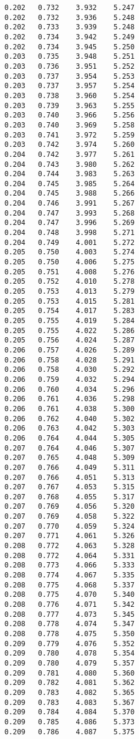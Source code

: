 \begin{verbatim}
   0.202   0.732    3.932    5.247
   0.202   0.732    3.936    5.248
   0.202   0.733    3.939    5.248
   0.202   0.734    3.942    5.249
   0.202   0.734    3.945    5.250
   0.203   0.735    3.948    5.251
   0.203   0.736    3.951    5.252
   0.203   0.737    3.954    5.253
   0.203   0.737    3.957    5.254
   0.203   0.738    3.960    5.254
   0.203   0.739    3.963    5.255
   0.203   0.740    3.966    5.256
   0.203   0.740    3.969    5.258
   0.203   0.741    3.972    5.259
   0.203   0.742    3.974    5.260
   0.204   0.742    3.977    5.261
   0.204   0.743    3.980    5.262
   0.204   0.744    3.983    5.263
   0.204   0.745    3.985    5.264
   0.204   0.745    3.988    5.266
   0.204   0.746    3.991    5.267
   0.204   0.747    3.993    5.268
   0.204   0.747    3.996    5.269
   0.204   0.748    3.998    5.271
   0.204   0.749    4.001    5.272
   0.205   0.750    4.003    5.274
   0.205   0.750    4.006    5.275
   0.205   0.751    4.008    5.276
   0.205   0.752    4.010    5.278
   0.205   0.753    4.013    5.279
   0.205   0.753    4.015    5.281
   0.205   0.754    4.017    5.283
   0.205   0.755    4.019    5.284
   0.205   0.755    4.022    5.286
   0.205   0.756    4.024    5.287
   0.206   0.757    4.026    5.289
   0.206   0.758    4.028    5.291
   0.206   0.758    4.030    5.292
   0.206   0.759    4.032    5.294
   0.206   0.760    4.034    5.296
   0.206   0.761    4.036    5.298
   0.206   0.761    4.038    5.300
   0.206   0.762    4.040    5.302
   0.206   0.763    4.042    5.303
   0.206   0.764    4.044    5.305
   0.207   0.764    4.046    5.307
   0.207   0.765    4.048    5.309
   0.207   0.766    4.049    5.311
   0.207   0.766    4.051    5.313
   0.207   0.767    4.053    5.315
   0.207   0.768    4.055    5.317
   0.207   0.769    4.056    5.320
   0.207   0.769    4.058    5.322
   0.207   0.770    4.059    5.324
   0.207   0.771    4.061    5.326
   0.208   0.772    4.063    5.328
   0.208   0.772    4.064    5.331
   0.208   0.773    4.066    5.333
   0.208   0.774    4.067    5.335
   0.208   0.775    4.068    5.337
   0.208   0.775    4.070    5.340
   0.208   0.776    4.071    5.342
   0.208   0.777    4.073    5.345
   0.208   0.778    4.074    5.347
   0.208   0.778    4.075    5.350
   0.209   0.779    4.076    5.352
   0.209   0.780    4.078    5.354
   0.209   0.780    4.079    5.357
   0.209   0.781    4.080    5.360
   0.209   0.782    4.081    5.362
   0.209   0.783    4.082    5.365
   0.209   0.783    4.083    5.367
   0.209   0.784    4.084    5.370
   0.209   0.785    4.086    5.373
   0.209   0.786    4.087    5.375

\end{verbatim}

